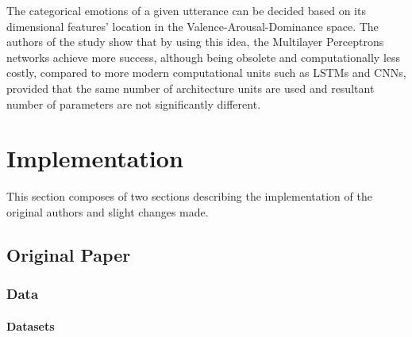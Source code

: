 \documentclass[a4paper,11pt]{article}
\begin{document}
\begin{table}[h]
\caption{\label{tab:vadtable}VAD Dimensions of 6 basic emotions \cite{bualan2020emotion}.}
\end{table}

The categorical emotions of a given utterance can be decided based on its dimensional features' location in the Valence-Arousal-Dominance space. The authors of the study show that by using this idea, the Multilayer Perceptrons networks achieve more success, although being obsolete and computationally less costly, compared to more modern computational units such as LSTMs and CNNs, provided that the same number of architecture units are used and resultant number of parameters are not significantly different.

\pagebreak

\section{Implementation} \label{sec:implementation}

This section composes of two sections describing the implementation of the original authors and slight changes made.

\subsection{Original Paper}
\subsubsection{Data} 

\paragraph{Datasets}
\end{document}
